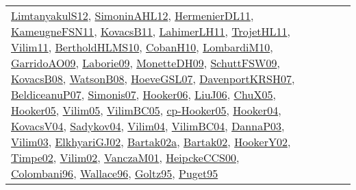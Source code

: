 {\begin{longtable}{lp{3cm}>{\raggedright}p{6cm}>{\raggedright}p{6cm}p{8cm}}
\href{articles/LimtanyakulS12.pdf}{LimtanyakulS12}\cite{LimtanyakulS12}, \href{papers/SimoninAHL12.pdf}{SimoninAHL12}\cite{SimoninAHL12}, \href{papers/HermenierDL11.pdf}{HermenierDL11}\cite{HermenierDL11}, \href{papers/KameugneFSN11.pdf}{KameugneFSN11}\cite{KameugneFSN11}, \href{articles/KovacsB11.pdf}{KovacsB11}\cite{KovacsB11}, \href{papers/LahimerLH11.pdf}{LahimerLH11}\cite{LahimerLH11}, \href{articles/TrojetHL11.pdf}{TrojetHL11}\cite{TrojetHL11}, \href{papers/Vilim11.pdf}{Vilim11}\cite{Vilim11}, \href{papers/BertholdHLMS10.pdf}{BertholdHLMS10}\cite{BertholdHLMS10}, \href{papers/CobanH10.pdf}{CobanH10}\cite{CobanH10}, \href{papers/LombardiM10.pdf}{LombardiM10}\cite{LombardiM10}, \href{articles/GarridoAO09.pdf}{GarridoAO09}\cite{GarridoAO09}, \href{papers/Laborie09.pdf}{Laborie09}\cite{Laborie09}, \href{papers/MonetteDH09.pdf}{MonetteDH09}\cite{MonetteDH09}, \href{papers/SchuttFSW09.pdf}{SchuttFSW09}\cite{SchuttFSW09}, \href{articles/KovacsB08.pdf}{KovacsB08}\cite{KovacsB08}, \href{papers/WatsonB08.pdf}{WatsonB08}\cite{WatsonB08}, \href{papers/HoeveGSL07.pdf}{HoeveGSL07}\cite{HoeveGSL07}, \href{papers/DavenportKRSH07.pdf}{DavenportKRSH07}\cite{DavenportKRSH07}, \href{papers/BeldiceanuP07.pdf}{BeldiceanuP07}\cite{BeldiceanuP07}, \href{articles/Simonis07.pdf}{Simonis07}\cite{Simonis07}, \href{articles/Hooker06.pdf}{Hooker06}\cite{Hooker06}, \href{papers/LiuJ06.pdf}{LiuJ06}\cite{LiuJ06}, \href{papers/ChuX05.pdf}{ChuX05}\cite{ChuX05}, \href{articles/Hooker05.pdf}{Hooker05}\cite{Hooker05}, \href{papers/Vilim05.pdf}{Vilim05}\cite{Vilim05}, \href{articles/VilimBC05.pdf}{VilimBC05}\cite{VilimBC05}, \href{papers/cp-Hooker05.pdf}{cp-Hooker05}\cite{cp-Hooker05}, \href{papers/Hooker04.pdf}{Hooker04}\cite{Hooker04}, \href{papers/KovacsV04.pdf}{KovacsV04}\cite{KovacsV04}, \href{papers/Sadykov04.pdf}{Sadykov04}\cite{Sadykov04}, \href{papers/Vilim04.pdf}{Vilim04}\cite{Vilim04}, \href{papers/VilimBC04.pdf}{VilimBC04}\cite{VilimBC04}, \href{papers/DannaP03.pdf}{DannaP03}\cite{DannaP03}, \href{papers/Vilim03.pdf}{Vilim03}\cite{Vilim03}, \href{papers/ElkhyariGJ02.pdf}{ElkhyariGJ02}\cite{ElkhyariGJ02}, \href{papers/Bartak02a.pdf}{Bartak02a}\cite{Bartak02a}, \href{papers/Bartak02.pdf}{Bartak02}\cite{Bartak02}, \href{papers/HookerY02.pdf}{HookerY02}\cite{HookerY02}, \href{articles/Timpe02.pdf}{Timpe02}\cite{Timpe02}, \href{papers/Vilim02.pdf}{Vilim02}\cite{Vilim02}, \href{papers/VanczaM01.pdf}{VanczaM01}\cite{VanczaM01}, \href{articles/HeipckeCCS00.pdf}{HeipckeCCS00}\cite{HeipckeCCS00}, \href{papers/Colombani96.pdf}{Colombani96}\cite{Colombani96}, \href{articles/Wallace96.pdf}{Wallace96}\cite{Wallace96}, \href{papers/Goltz95.pdf}{Goltz95}\cite{Goltz95}, \href{papers/Puget95.pdf}{Puget95}\cite{Puget95}\\

\end{longtable}}
